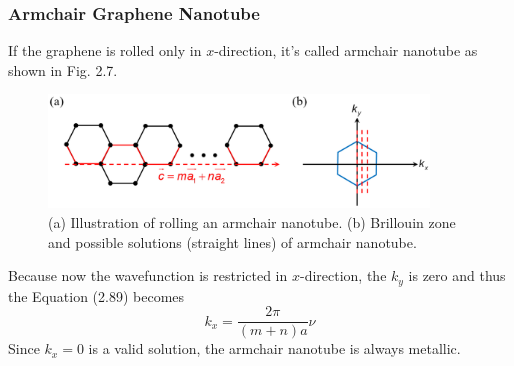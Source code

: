 \subsubsection{Armchair Graphene Nanotube}
If the graphene is rolled only in $x$-direction, it's called armchair nanotube as shown in Fig. 2.7.
\begin{figure}[tbp]
\includegraphics[width=0.9\textwidth]{figures/Fig2_7}
\centering
\caption{\small (a) Illustration of rolling an armchair nanotube. (b) Brillouin zone and possible solutions (straight lines) of armchair nanotube.}
\end{figure} Because now the wavefunction is restricted in $x$-direction, the $k_{y}$ is zero and thus the Equation (2.89) becomes \begin{equation}
    k_{x} = \frac{2\pi}{\left(m+n\right)a}\nu
\end{equation} Since $k_{x} = 0$ is a valid solution, the armchair nanotube is always metallic.
